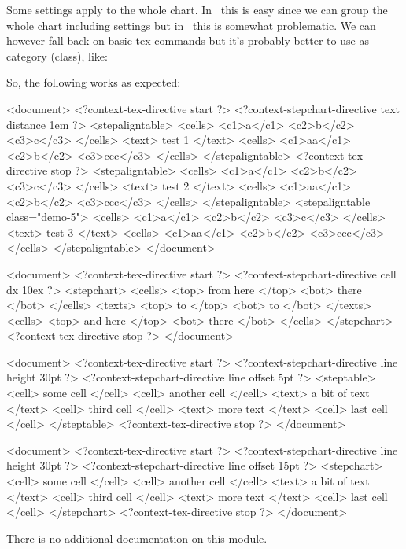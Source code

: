\typebuffer \processxmlbuffer

Some settings apply to the whole chart. In \TEX\ this is easy since we
can group the whole chart including settings but in \XML\ this is somewhat
problematic. We can however fall back on basic tex commands but it's
probably better to use as category (class), like:

\startbuffer
\setupSTEPtexts[demo-5][distance=3em]
\stopbuffer

\typebuffer \getbuffer

\noindentation So, the following works as expected:

\startbuffer
<document>
  <?context-tex-directive start ?>
  <?context-stepchart-directive text distance 1em ?>
  <stepaligntable>
  <cells> <c1>a</c1> <c2>b</c2> <c3>c</c3> </cells>
  <text> test 1 </text>
  <cells> <c1>aa</c1> <c2>b</c2> <c3>ccc</c3> </cells>
  </stepaligntable>
  <?context-tex-directive stop ?>
  <stepaligntable>
    <cells> <c1>a</c1> <c2>b</c2> <c3>c</c3> </cells>
    <text> test 2 </text>
    <cells> <c1>aa</c1> <c2>b</c2> <c3>ccc</c3> </cells>
  </stepaligntable>
  <stepaligntable class="demo-5">
    <cells> <c1>a</c1> <c2>b</c2> <c3>c</c3> </cells>
    <text> test 3 </text>
    <cells> <c1>aa</c1> <c2>b</c2> <c3>ccc</c3> </cells>
  </stepaligntable>
</document>
\stopbuffer

\typebuffer \processxmlbuffer

\startbuffer
<document>
  <?context-tex-directive start ?>
  <?context-stepchart-directive cell dx 10ex ?>
  <stepchart>
    <cells> <top> from here </top> <bot> there </bot> </cells>
    <texts> <top> to        </top> <bot> to    </bot> </texts>
    <cells> <top> and here  </top> <bot> there </bot> </cells>
  </stepchart>
  <?context-tex-directive stop ?>
</document>
\stopbuffer

\typebuffer \processxmlbuffer

\startbuffer
<document>
  <?context-tex-directive start ?>
  <?context-stepchart-directive line height 30pt ?>
  <?context-stepchart-directive line offset  5pt ?>
  <steptable>
    <cell> some cell </cell>
    <cell> another cell </cell> <text> a bit of text </text>
    <cell> third cell </cell> <text> more text </text>
    <cell> last cell </cell>
  </steptable>
  <?context-tex-directive stop ?>
</document>
\stopbuffer

\typebuffer \processxmlbuffer

\startbuffer
<document>
  <?context-tex-directive start ?>
  <?context-stepchart-directive line height 30pt ?>
  <?context-stepchart-directive line offset 15pt ?>
  <stepchart>
    <cell> some cell </cell>
    <cell> another cell </cell> <text> a bit of text </text>
    <cell> third cell </cell> <text> more text </text>
    <cell> last cell </cell>
  </stepchart>
  <?context-tex-directive stop ?>
</document>
\stopbuffer

\typebuffer \processxmlbuffer

\stopsection

\startsection[title=Documentation]

There is no additional documentation on this module.

\stopsection

\stopdocument

